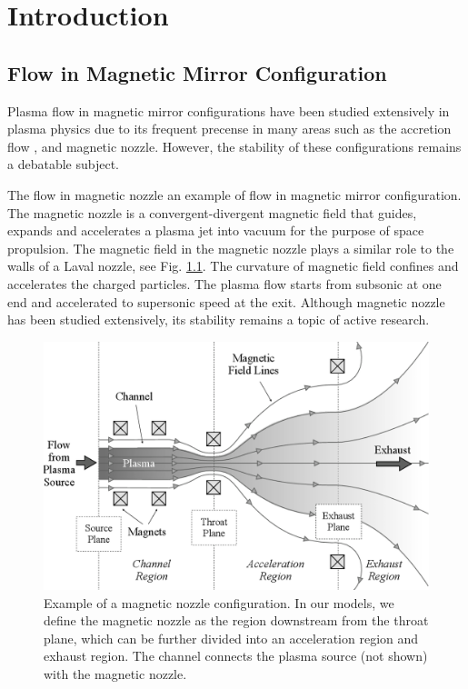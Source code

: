 \chapter{Introduction}

\section{Flow in Magnetic Mirror Configuration}
Plasma flow in magnetic mirror configurations have been studied extensively in plasma physics due to its frequent precense in many areas such as the accretion flow \cite{jockers_stability_1968,aikawa_stability_1979}, and magnetic nozzle\cite{smolyakov_quasineutral_2021}. However, the stability of these configurations remains a debatable subject.

The flow in magnetic nozzle an example of flow in magnetic mirror configuration. The magnetic nozzle is a convergent-divergent magnetic field that guides, expands and accelerates a plasma jet into vacuum for the purpose of space propulsion. \cite{andersen_continuous_1969,boswell_experimental_2004,williams_fusion_2003} The magnetic field in the magnetic nozzle plays a similar role to the walls of a Laval nozzle, see Fig. \ref{fig:magnetic-nozzle}. The curvature of magnetic field confines and accelerates the charged particles. The plasma flow starts from subsonic at one end and accelerated to supersonic speed at the exit. Although magnetic nozzle has been studied extensively, its stability remains a topic of active research.

\begin{figure}[h]
	\centering
	\includegraphics[width=0.7\linewidth]{../../thesis/img/introduction/magnetic-nozzle}
	\caption{Example of a magnetic nozzle configuration. In our models, we define the magnetic nozzle as the region downstream from the throat plane, which can be further divided into an acceleration region and exhaust region. The channel connects the plasma source (not shown) with the magnetic nozzle. \cite{little_performance_2015}}
	\label{fig:magnetic-nozzle}
\end{figure}

